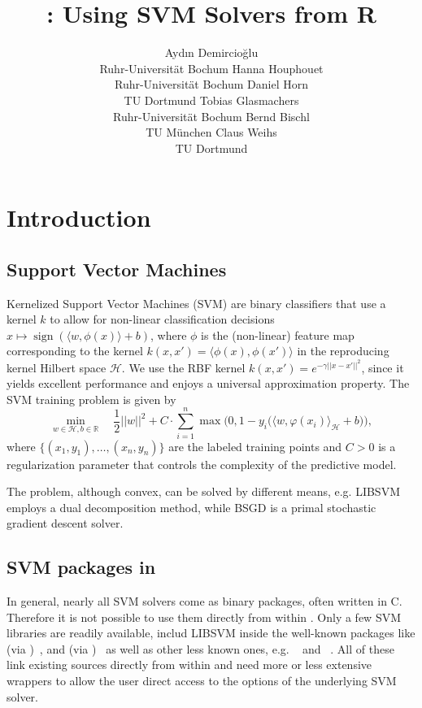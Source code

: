 \documentclass[article, shortnames]{jss}
\author{Ayd\i n Demircio\u{g}lu\\Ruhr-Universit\"at Bochum \And 
Hanna Houphouet\\Ruhr-Universit\"at Bochum \And 
        Daniel Horn\\TU Dortmund \AND
        Tobias Glasmachers\\Ruhr-Universit\"at Bochum \And 
        Bernd Bischl\\TU M\"unchen \And 
        Claus Weihs\\TU Dortmund}
\title{\pkg{SVMBridge}: Using SVM Solvers from R}
\newcommand{\sign}{\mathop{\mathrm{sign}}}
\newcommand{\R}{\mathbb{R}}
\begin{document}


\section{Introduction}



\subsection{Support Vector Machines}



Kernelized Support Vector Machines (SVM) \cite{cortes1995support}
are binary classifiers that use a kernel $k$ to allow for non-linear
classification decisions
$x \mapsto \sign( \langle w, \phi(x) \rangle + b)$, where $\phi$ is the
(non-linear) feature map corresponding to the kernel
$k(x, x') = \langle \phi(x), \phi(x') \rangle$ in the reproducing kernel
Hilbert space $\mathcal{H}$.
We use the RBF kernel $k(x,x') = e^{-\gamma || x-x' ||^2}$, since it
yields excellent performance and enjoys a universal approximation
property.
The SVM training problem is given by
\begin{equation}
\min_{w \in \mathcal{H}, b \in \R} \quad \frac{1}{2} ||w||^2 + C \cdot \sum_{i=1}^n \max \Big( 0, 1 - y_i \big( \langle w, \varphi(x_i) \rangle_{\mathcal{H}} + b \big) \Big),
\label{primalproblem}
\end{equation}
where $\big\{(x_1, y_1), \dots, (x_n, y_n)\big\}$ are the labeled
training points and $C > 0$ is a regularization parameter that controls
the complexity of the predictive model.


The problem, although convex, can be solved by different means,
e.g. LIBSVM employs a dual
decomposition method, while  BSGD is a primal stochastic
gradient descent solver. 



\subsection[SVM packages in R]{SVM packages in }

In general, nearly all SVM solvers come as binary packages,
often written in C. Therefore it is not possible to use them 
directly from within . Only a few SVM libraries are readily available,
includ LIBSVM inside the well-known packages like  (via )~\citep{kernlab}, 
and  (via )~\citep{dimitriadou2008misc}
as well as other less known ones, e.g. ~\citep{SwarmSVM} 
and ~\citep{lasvmR}.
All of these link existing  sources directly from within  and need
more or less extensive wrappers to allow the user direct access to
the options of the underlying SVM solver.
\end{document}
